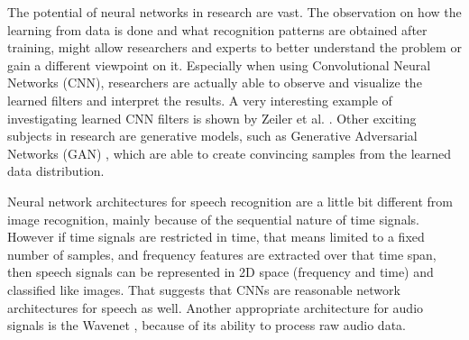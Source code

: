 The potential of neural networks in research are vast.
The observation on how the learning from data is done and what recognition patterns are obtained after training, might allow researchers and experts to better understand the problem or gain a different viewpoint on it.
Especially when using Convolutional Neural Networks (CNN), researchers are actually able to observe and visualize the learned filters and interpret the results.
A very interesting example of investigating learned CNN filters is shown by Zeiler et al. \cite{Zeiler2013}.
Other exciting subjects in research are generative models, such as Generative Adversarial Networks (GAN) \cite{Goodfellow2014}, which are able to create convincing samples from the learned data distribution.

Neural network architectures for speech recognition are a little bit different from image recognition, mainly because of the sequential nature of time signals.
However if time signals are restricted in time, that means limited to a fixed number of samples, and frequency features are extracted over that time span, then speech signals can be represented in 2D space (frequency and time) and classified like images.
That suggests that CNNs are reasonable network architectures for speech as well.
Another appropriate architecture for audio signals is the Wavenet \cite{Oord2016}, because of its ability to process raw audio data.


